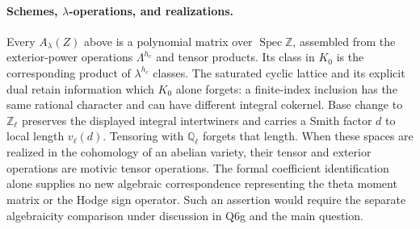\paragraph{Schemes, $\lambda$-operations, and realizations.}
Every $A_\lambda(Z)$ above is a polynomial matrix over
$\operatorname{Spec}\mathbb Z$, assembled from the exterior-power
operations $\Lambda^{h_c}$ and tensor products. Its class in $K_0$
is the corresponding product of $\lambda^{h_c}$ classes. The
saturated cyclic lattice and its explicit dual retain information
which $K_0$ alone forgets: a finite-index inclusion has the same
rational character and can have different integral cokernel.
Base change to $\mathbb Z_\ell$ preserves the displayed integral
intertwiners and carries a Smith factor $d$ to local length
$v_\ell(d)$. Tensoring with $\mathbb Q_\ell$ forgets that length.
When these spaces are realized in the cohomology of an abelian
variety, their tensor and exterior operations are motivic tensor
operations. The formal coefficient identification alone supplies no
new algebraic correspondence representing the theta moment matrix
or the Hodge sign operator. Such an assertion would require the
separate algebraicity comparison under discussion in Q6g and the
main question.
